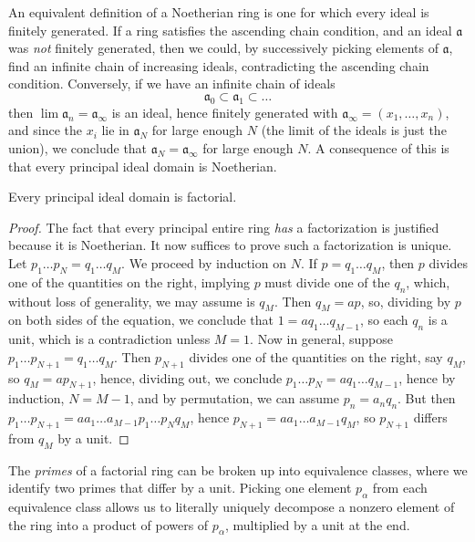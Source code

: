 An equivalent definition of a Noetherian ring is one for which every ideal is finitely generated. If a ring satisfies the ascending chain condition, and an ideal $\mathfrak{a}$ was {\it not} finitely generated, then we could, by successively picking elements of $\mathfrak{a}$, find an infinite chain of increasing ideals, contradicting the ascending chain condition. Conversely, if we have an infinite chain of ideals
%
\[ \mathfrak{a}_0 \subset \mathfrak{a}_1 \subset \dots \]
%
then $\lim \mathfrak{a}_n = \mathfrak{a}_\infty$ is an ideal, hence finitely generated with $\mathfrak{a}_\infty = (x_1, \dots, x_n)$, and since the $x_i$ lie in $\mathfrak{a}_N$ for large enough $N$ (the limit of the ideals is just the union), we conclude that $\mathfrak{a}_N = \mathfrak{a}_\infty$ for large enough $N$. A consequence of this is that every principal ideal domain is Noetherian.

\begin{theorem}
    Every principal ideal domain is factorial.
\end{theorem}
\begin{proof}
    The fact that every principal entire ring {\it has} a factorization is justified because it is Noetherian. It now suffices to prove such a factorization is unique. Let $p_1 \dots p_N = q_1 \dots q_M$. We proceed by induction on $N$. If $p = q_1 \dots q_M$, then $p$ divides one of the quantities on the right, implying $p$ must divide one of the $q_n$, which, without loss of generality, we may assume is $q_M$. Then $q_M = ap$, so, dividing by $p$ on both sides of the equation, we conclude that $1 = a q_1 \dots q_{M-1}$, so each $q_n$ is a unit, which is a contradiction unless $M = 1$. Now in general, suppose $p_1 \dots p_{N+1} = q_1 \dots q_M$. Then $p_{N+1}$ divides one of the quantities on the right, say $q_M$, so $q_M = ap_{N+1}$, hence, dividing out, we conclude $p_1 \dots p_N = a q_1 \dots q_{M-1}$, hence by induction, $N = M-1$, and by permutation, we can assume $p_n = a_nq_n$. But then $p_1 \dots p_{N+1} = aa_1 \dots a_{M-1} p_1 \dots p_N q_M$, hence $p_{N+1} = aa_1 \dots a_{M-1} q_M$, so $p_{N+1}$ differs from $q_M$ by a unit.
\end{proof}

The {\it primes} of a factorial ring can be broken up into equivalence classes, where we identify two primes that differ by a unit. Picking one element $p_\alpha$ from each equivalence class allows us to literally uniquely decompose a nonzero element of the ring into a product of powers of $p_\alpha$, multiplied by a unit at the end.

